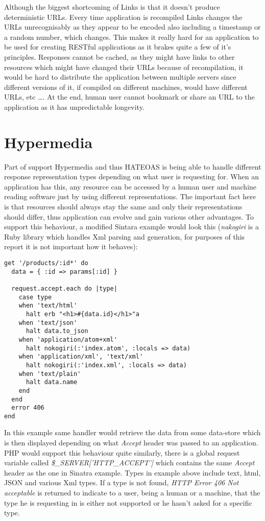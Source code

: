 Although the biggest shortcoming of Links is that it doesn't produce deterministic URLs. Every time application is recompiled Links changes the URLs unrecognisably as they appear to be encoded also including a timestamp or a random number, which changes. This makes it really hard for an application to be used for creating RESTful applications as it brakes quite a few of it's principles. Responses cannot be cached, as they might have links to other resources which might have changed their URLs because of recompilation, it would be hard to distribute the application between multiple servers since different versions of it, if compiled on different machines, would have different URLs, etc \ldots. At the end, human user cannot bookmark or share an URL to the application as it has unpredictable longevity. 

\section{Hypermedia}

Part of support Hypermedia and thus HATEOAS\citep{rest} is being able to handle different response representation types depending on what user is requesting for. When an application has this, any resource can be accessed by a human user and machine reading software just by using different representations. The important fact here is that resources should always stay the same and only their representations should differ, thus application can evolve and gain various other advantages. To support this behaviour, a modified Sintara example would look this (\textit{nakogiri} is a Ruby library which handles Xml parsing and generation, for purposes of this report it is not important how it behaves):

\begin{codelisting}
\begin{verbatim}
get '/products/:id*' do
  data = { :id => params[:id] }

  request.accept.each do |type|
    case type
    when 'text/html'
      halt erb "<h1>#{data.id}</h1>"a
    when 'text/json'
      halt data.to_json
    when 'application/atom+xml'
      halt nokogiri(:'index.atom', :locals => data)
    when 'application/xml', 'text/xml'
      halt nokogiri(:'index.xml', :locals => data)
    when 'text/plain'
      halt data.name
    end
  end
  error 406
end
\end{verbatim}
\end{codelisting}

In this example same handler would retrieve the data from some data-store which is then displayed depending on what \textit{Accept} header was passed to an application. PHP would support this behaviour quite similarly, there is a global request variable called \textit{\$\_SERVER['HTTP\_ACCEPT']} which contains the same \textit{Accept} header as the one in Sinatra example. Types in example above include text, html, JSON and various Xml types. If a type is not found, \textit{HTTP Error 406 Not acceptable} is returned to indicate to a user, being a human or a machine, that the type he is requesting in is either not supported or he hasn't asked for a specific type. 

